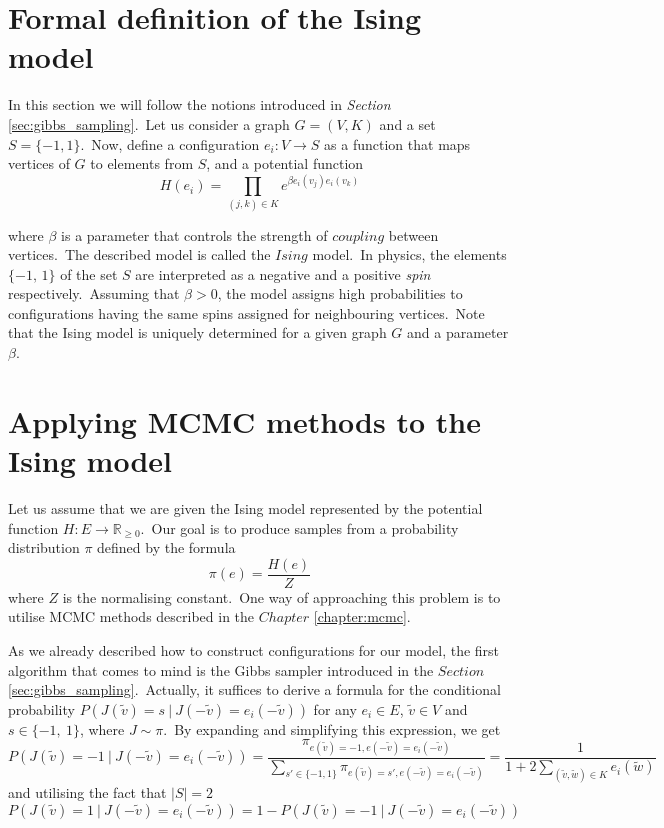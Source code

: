 \documentclass[shortabstract, english, lic]{iithesis}
\theoremstyle{default_theorem_style}\newtheorem{theorem}{Theorem}
\theoremstyle{default_theorem_style}\newtheorem{definition}{Definition}
\begin{document}
\section{Formal definition of the Ising model}

In this section we will follow the notions introduced in \textit{Section} \ref{sec:gibbs_sampling}.\ Let us consider
a graph $G = (V, K)$ and a set $S = \{-1, 1\}$.\ Now, define a configuration $e_i : V \to S$ as a function that
maps vertices of $G$ to elements from $S$, and a potential function
$$
H(e_i) = \prod\limits_{(j, k) \in K} e^{\beta e_i(v_j)e_i(v_k)}
$$

\noindent where $\beta$ is a parameter that controls the strength of $coupling$ between vertices.\ The described model
is called the $Ising$ model.\ In physics, the elements $\{-1, \, 1\}$ of the set $S$ are interpreted as a negative and a
positive \textit{spin} respectively.\ Assuming that $\beta > 0$, the model assigns high probabilities to configurations
having the same spins assigned for neighbouring vertices.\ Note that the Ising model is uniquely determined for
a given graph $G$ and a parameter $\beta$.

\section{Applying MCMC methods to the Ising model}

Let us assume that we are given the Ising model represented by the potential function
$H : E \to \mathbb R_{\geq 0}$.\ Our goal is to produce samples from a probability distribution $\pi$ defined by
the formula
$$
\pi(e) = \frac{H(e)}{Z}
$$
where $Z$ is the normalising constant.\ One way of approaching this problem is to utilise MCMC methods described in
the $Chapter$ \ref{chapter:mcmc}.\newline

\noindent As we already described how to construct configurations for our model, the first algorithm that comes to mind
is the Gibbs sampler introduced in the $Section$ \ref{sec:gibbs_sampling}.\ Actually, it suffices to derive a formula
for the conditional probability $P(J(\tilde{v}) = s\ |\ J(-\tilde{v})=e_i(-\tilde{v}))$ for any $e_i \in E$,
$\tilde{v} \in V$ and $s \in \{-1,\ 1\}$, where $J \sim \pi$.\ By expanding and simplifying this expression, we get
$$
P(J(\tilde{v}) = -1\ |\ J(-\tilde{v})=e_i(-\tilde{v})) =
\frac{\pi_{e(\tilde{v}) =
-1,e(-\tilde{v}) = e_i(-\tilde{v})}}
{\sum\limits_{s' \in \{-1, 1\}} \pi_{e(\tilde{v}) = s', e(-\tilde{v}) = e_i(-\tilde{v})}} =
\frac{1}{1 + 2 \sum\limits_{(\tilde{v}, \tilde{w}) \in K} e_i(\tilde{w})}
$$
and utilising the fact that $|S| = 2$
$$
P(J(\tilde{v}) = 1\ |\ J(-\tilde{v})=e_i(-\tilde{v})) = 1 - P(J(\tilde{v}) = -1\ |\ J(-\tilde{v})=e_i(-\tilde{v}))
$$
\end{document}
